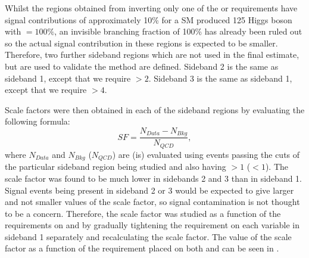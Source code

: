 Whilst the regions obtained from inverting only one of the \jetmetdphi or \METsig requirements have signal contributions of approximately 10\% for a \ac{SM} produced 125 \GeV Higgs boson with \BRinv$=100\%$, an invisible branching fraction of 100\% has already been ruled out so the actual signal contribution in these regions is expected to be smaller. Therefore, two further sideband regions which are not used in the final estimate, but are used to validate the method are defined. Sideband 2 is the same as sideband 1, except that we require \jetmetdphileading$>2$. Sideband 3 is the same as sideband 1, except that we require \METsig$>4$. 



Scale factors were then obtained in each of the sideband regions by evaluating the following formula:
\begin{equation}
  SF=\frac{N_{Data}-N_{Bkg}}{N_{QCD}},
  \label{eq:parkedqcdscalefactor}
\end{equation}
where $N_{Data}$ and $N_{Bkg}$ ($N_{QCD}$) are (is)  evaluated using events passing the cuts of the particular sideband region being studied and also having \jetmetdphi$>1$ (\jetmetdphi$<1$). The scale factor was found to be much lower in sidebands 2 and 3 than in sideband 1. Signal events being present in sideband 2 or 3 would be expected to give larger and not smaller values of the scale factor, so signal contamination is not thought to be a concern. Therefore, the scale factor was studied as a function of the requirements on \jetmetdphileading and \METsig by gradually tightening the requirement on each variable in sideband 1 separately and recalculating the scale factor. The value of the scale factor as a function of the requirement placed on both \jetmetdphileading and \METsig can be seen in .



